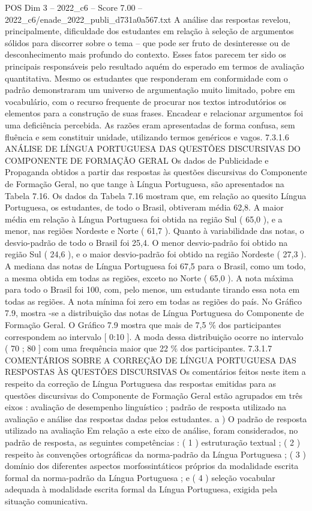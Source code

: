 \begin{textsample}{POS Dim 3 – 2022\_c6 – Score 7.00 – 2022\_c6/enade\_2022\_publi\_d731a0a567.txt}
A análise das respostas revelou, principalmente, dificuldade dos estudantes em relação à seleção de argumentos sólidos para discorrer sobre o tema – que pode ser fruto de desinteresse ou de desconhecimento mais profundo do contexto.
Esses fatos parecem ter sido os principais responsáveis pelo resultado aquém do esperado em termos de avaliação quantitativa.
Mesmo os estudantes que responderam em conformidade com o padrão demonstraram um universo de argumentação muito limitado, pobre em vocabulário, com o recurso frequente de procurar nos textos introdutórios os elementos para a construção de suas frases.
Encadear e relacionar argumentos foi uma deficiência percebida.
As razões eram apresentadas de forma confusa, sem fluência e sem constituir unidade, utilizando termos genéricos e vagos. 7.3.1.6 ANÁLISE DE LÍNGUA PORTUGUESA DAS QUESTÕES DISCURSIVAS DO COMPONENTE DE FORMAÇÃO GERAL Os dados de Publicidade e Propaganda obtidos a partir das respostas às questões discursivas do Componente de Formação Geral, no que tange à Língua Portuguesa, são apresentados na Tabela 7.16.
Os dados da Tabela 7.16 mostram que, em relação ao quesito Língua Portuguesa, os estudantes, de todo o Brasil, obtiveram média 62,8.
A maior média em relação à Língua Portuguesa foi obtida na região Sul ( 65,0 ), e a menor, nas regiões Nordeste e Norte ( 61,7 ).
Quanto à variabilidade das notas, o desvio-padrão de todo o Brasil foi 25,4.
O menor desvio-padrão foi obtido na região Sul ( 24,6 ), e o maior desvio-padrão foi obtido na região Nordeste ( 27,3 ).
A mediana das notas de Língua Portuguesa foi 67,5 para o Brasil, como um todo, a mesma obtida em todas as regiões, exceto no Norte ( 65,0 ).
A nota máxima para todo o Brasil foi 100, com, pelo menos, um estudante tirando essa nota em todas as regiões.
A nota mínima foi zero em todas as regiões do país.
No Gráfico 7.9, mostra -se a distribuição das notas de Língua Portuguesa do Componente de Formação Geral.
O Gráfico 7.9 mostra que mais de 7,5 \% dos participantes correspondem ao intervalo [ 0:10 ].
A moda dessa distribuição ocorre no intervalo ( 70 ; 80 ] com uma frequência maior que 22 \% dos participantes. 7.3.1.7 COMENTÁRIOS SOBRE A CORREÇÃO DE LÍNGUA PORTUGUESA DAS RESPOSTAS ÀS QUESTÕES DISCURSIVAS Os comentários feitos neste item a respeito da correção de Língua Portuguesa das respostas emitidas para as questões discursivas do Componente de Formação Geral estão agrupados em três eixos : avaliação de desempenho linguístico ; padrão de resposta utilizado na avaliação e análise das respostas dadas pelos estudantes. a ) O padrão de resposta utilizado na avaliação Em relação a este eixo de análise, foram considerados, no padrão de resposta, as seguintes competências : ( 1 ) estruturação textual ; ( 2 ) respeito às convenções ortográficas da norma-padrão da Língua Portuguesa ; ( 3 ) domínio dos diferentes aspectos morfossintáticos próprios da modalidade escrita formal da norma-padrão da Língua Portuguesa ; e ( 4 ) seleção vocabular adequada à modalidade escrita formal da Língua Portuguesa, exigida pela situação comunicativa.

\end{textsample}
